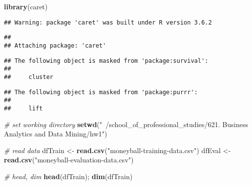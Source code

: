 \documentclass[
]{article}
\newenvironment{Shaded}{\begin{snugshade}}{\end{snugshade}}
\newcommand{\CommentTok}[1]{\textcolor[rgb]{0.56,0.35,0.01}{\textit{#1}}}
\newcommand{\KeywordTok}[1]{\textcolor[rgb]{0.13,0.29,0.53}{\textbf{#1}}}
\newcommand{\NormalTok}[1]{#1}
\newcommand{\StringTok}[1]{\textcolor[rgb]{0.31,0.60,0.02}{#1}}
\begin{document}
\begin{Shaded}
\begin{Highlighting}[]
\KeywordTok{library}\NormalTok{(caret)}
\end{Highlighting}
\end{Shaded}

\begin{verbatim}
## Warning: package 'caret' was built under R version 3.6.2
\end{verbatim}

\begin{verbatim}
## 
## Attaching package: 'caret'
\end{verbatim}

\begin{verbatim}
## The following object is masked from 'package:survival':
## 
##     cluster
\end{verbatim}

\begin{verbatim}
## The following object is masked from 'package:purrr':
## 
##     lift
\end{verbatim}

\begin{Shaded}
\begin{Highlighting}[]
\CommentTok{# set working directory}
\KeywordTok{setwd}\NormalTok{(}\StringTok{"~/school_of_professional_studies/621. Business Analytics and Data Mining/hw1"}\NormalTok{)}

\CommentTok{# read data}
\NormalTok{dfTrain <-}\StringTok{ }\KeywordTok{read.csv}\NormalTok{(}\StringTok{"moneyball-training-data.csv"}\NormalTok{)}
\NormalTok{dfEval <-}\StringTok{ }\KeywordTok{read.csv}\NormalTok{(}\StringTok{"moneyball-evaluation-data.csv"}\NormalTok{)}

\CommentTok{# head, dim}
\KeywordTok{head}\NormalTok{(dfTrain); }\KeywordTok{dim}\NormalTok{(dfTrain)}
\end{Highlighting}
\end{Shaded}
\end{document}
